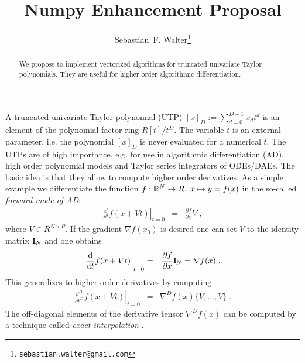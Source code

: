 \documentclass[a4paper,12pt,twoside]{article}
\title{Numpy Enhancement Proposal}
\author{Sebastian~F. Walter\footnote{\texttt{sebastian.walter@gmail.com}}}
\begin{document}
\maketitle

\begin{abstract}
We propose to implement vectorized algorithms for truncated univariate Taylor polynomials. They are useful for higher order algorithmic differentiation.
\end{abstract}

A truncated univariate Taylor polynomial (UTP) $[x]_D := \sum_{d=0}^{D-1} x_d t^d$ is an element of the polynomial factor ring $R[t]/t^D$. The variable $t$ is an external parameter, i.e. the polynomial $[x]_D$ is never evaluated for a numerical $t$. The UTPs are of high importance, e.g. for use in algorithmic differentiation (AD), high order polynomial models and Taylor series integrators of ODEs/DAEs.
The basic idea is that they allow to compute higher order derivatives. As a simple example we differentiate the function $f: {\mathbb R}^N \rightarrow R, \; x \mapsto y = f(x)$ in the so-called \emph{forward mode of AD}:
\begin{eqnarray}
\left. \frac{\dd}{\dd t} f( x + V t) \right|_{t=0} &=& \frac{\partial f}{\partial x} V \;,
\end{eqnarray}
where $V \in R^{N \times P}$. If the gradient $\nabla f(x_0)$ is desired one can set $V$ to the identity matrix $1 \!\!\! \mathrm I_N$ and one obtains 
\begin{eqnarray}
 \left. \frac{{\rm d}}{{\rm d} t} f( x + V t) \right|_{t=0} &=& \frac{\partial f}{\partial x} 1 \!\!\! \mathrm I_N = \nabla f(x)\;.
\end{eqnarray}
This generalizes to higher order derivatives by computing 
\begin{eqnarray}
\left. \frac{\dd^D}{\dd t^D} f(x + Vt) \right|_{t=0} &=& \nabla^D f(x) \{ V,\dots, V \} \;.
\end{eqnarray}
The off-diagonal elements of the derivative tensor $\nabla^D f(x)$ can be computed by a technique called \emph{exact interpolation} \cite{Griewank2008EDP}.
\end{document}

